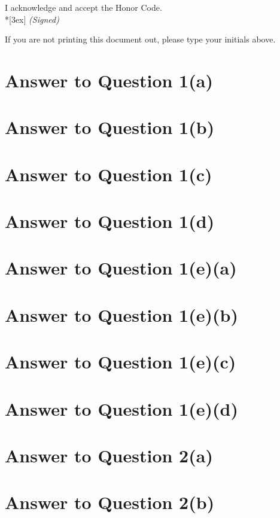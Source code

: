 \documentclass[11pt]{article}
\begin{document}
\vfill

I acknowledge and accept the Honor Code.\\*[3ex]
\bigskip
\textit{(Signed)}\hrulefill

If you are not printing this document out, please type your initials above.

\vfill
\vfill

\pagebreak[4]
\section*{Answer to Question 1(a)}

\section*{Answer to Question 1(b)}

\section*{Answer to Question 1(c)}

\section*{Answer to Question 1(d)}

\section*{Answer to Question 1(e)(a)}

\section*{Answer to Question 1(e)(b)}

\section*{Answer to Question 1(e)(c)}

\section*{Answer to Question 1(e)(d)}

\section*{Answer to Question 2(a)}

\section*{Answer to Question 2(b)}
\end{document}
